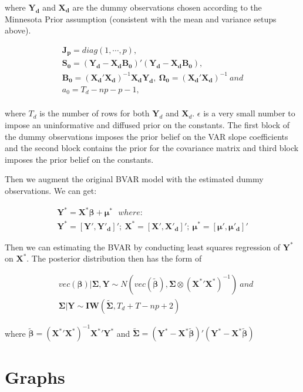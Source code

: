 \documentclass{monashthesis}
\begin{document}
where \(\bm{Y_d}\) and \(\bm{X_d}\) are the dummy observations chosen according to the Minnesota Prior assumption (consistent with the mean and variance setups above).

\[
\begin{aligned}
\bm{J_p}=diag(1,\cdots,p),\\
\bm{S_0}=(\bm{Y_d}-\bm{X_d} \bm{B_0})'(\bm{Y_d}-\bm{X_d}\bm{B_0}),\\
\bm{B_0}=(\bm{X_d}'\bm{X_d})^{-1}\bm{X_d}\bm{Y_d},\ \bm{\Omega_0}=(\bm{X_d}'\bm{X_d})^{-1}\  and\\
a_0=T_d-np-p-1, \\
\end{aligned}
\]

where \(T_d\) is the number of rows for both \(\boldsymbol{Y}_d\) and \(\boldsymbol{X}_d\). \(\epsilon\) is a very small number to impose an uninformative and diffused prior on the constants. The first block of the dummy observations imposes the prior belief on the VAR slope coefficients and the second block contains the prior for the covariance matrix and third block imposes the prior belief on the constants.

Then we augment the original BVAR model with the estimated dummy observations. We can get:

\[
\begin{aligned}
\bm{Y^*}=\bm{X^*}\bm{\beta}+\bm{\mu}^*\ \ \  where: \\
\bm{Y^*}=[\bm{Y'},\bm{Y'_d}]';\ \bm{X^*}=[\bm{X'},\bm{X'_d}]';\ \bm{\mu^*}=[\bm{\mu'},\bm{\mu'_d}]'
\end{aligned}
\]

Then we can estimating the BVAR by conducting least squares regression of \(\boldsymbol{Y}^*\) on \(\boldsymbol{X}^*\). The posterior distribution then has the form of

\[
\begin{aligned}
&vec(\bm{\beta})|\bm{\Sigma},\bm{Y}\sim N(vec(\boldsymbol{\tilde\beta}),\boldsymbol{\Sigma}\otimes(\boldsymbol{X^*}'\boldsymbol{X^*})^{-1})\ and\\
&\bm{\Sigma}|\bm{Y}\sim\bm{IW}(\bm{\tilde\Sigma},T_d+T-np+2)
\end{aligned}
\]

where \(\bm{\tilde\beta} =({\bm{X^{*}}}'\bm{X^{*}})^{-1} {\bm{X^{*}}}'\bm{Y^{*}}\) and \(\bm{\tilde\Sigma}=(\bm{Y^{*}}-\bm{X^{*}}\bm{\tilde\beta})'(\bm{Y^{*}}-\bm{X^{*}}\bm{\tilde\beta})\)

\hypertarget{graphs}{%
\chapter{Graphs}\label{graphs}}
\end{document}
